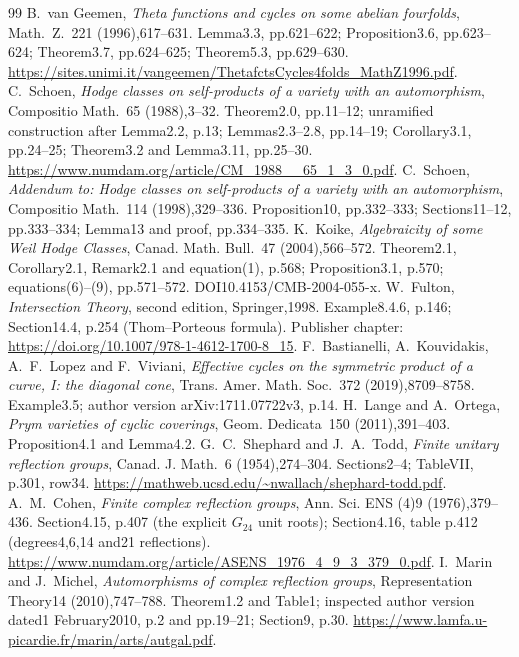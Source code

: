 \begin{thebibliography}{99}
\small
{} B.~van Geemen, \emph{Theta functions and cycles on some abelian fourfolds}, Math.~Z.~221 (1996),617--631. Lemma3.3, pp.621--622; Proposition3.6, pp.623--624; Theorem3.7, pp.624--625; Theorem5.3, pp.629--630. \url{https://sites.unimi.it/vangeemen/ThetafctsCycles4folds_MathZ1996.pdf}.
 C.~Schoen, \emph{Hodge classes on self-products of a variety with an automorphism}, Compositio Math.~65 (1988),3--32. Theorem2.0, pp.11--12; unramified construction after Lemma2.2, p.13; Lemmas2.3--2.8, pp.14--19; Corollary3.1, pp.24--25; Theorem3.2 and Lemma3.11, pp.25--30. \url{https://www.numdam.org/article/CM_1988__65_1_3_0.pdf}.
 C.~Schoen, \emph{Addendum to: Hodge classes on self-products of a variety with an automorphism}, Compositio Math.~114 (1998),329--336. Proposition10, pp.332--333; Sections11--12, pp.333--334; Lemma13 and proof, pp.334--335.
 K.~Koike, \emph{Algebraicity of some Weil Hodge Classes}, Canad. Math. Bull.~47 (2004),566--572. Theorem2.1, Corollary2.1, Remark2.1 and equation(1), p.568; Proposition3.1, p.570; equations(6)--(9), pp.571--572. DOI10.4153/CMB-2004-055-x.
 W.~Fulton, \emph{Intersection Theory}, second edition, Springer,1998. Example8.4.6, p.146; Section14.4, p.254 (Thom--Porteous formula). Publisher chapter: \url{https://doi.org/10.1007/978-1-4612-1700-8_15}.
 F.~Bastianelli, A.~Kouvidakis, A.~F.~Lopez and F.~Viviani, \emph{Effective cycles on the symmetric product of a curve, I: the diagonal cone}, Trans. Amer. Math. Soc.~372 (2019),8709--8758. Example3.5; author version arXiv:1711.07722v3, p.14.
 H.~Lange and A.~Ortega, \emph{Prym varieties of cyclic coverings}, Geom. Dedicata~150 (2011),391--403. Proposition4.1 and Lemma4.2.
 G.~C.~Shephard and J.~A.~Todd, \emph{Finite unitary reflection groups}, Canad. J. Math.~6 (1954),274--304. Sections2--4; TableVII, p.301, row34. \url{https://mathweb.ucsd.edu/~nwallach/shephard-todd.pdf}.
 A.~M.~Cohen, \emph{Finite complex reflection groups}, Ann. Sci. ENS (4)9 (1976),379--436. Section4.15, p.407 (the explicit $G_{24}$ unit roots); Section4.16, table p.412 (degrees4,6,14 and21 reflections). \url{https://www.numdam.org/article/ASENS_1976_4_9_3_379_0.pdf}.
 I.~Marin and J.~Michel, \emph{Automorphisms of complex reflection groups}, Representation Theory14 (2010),747--788. Theorem1.2 and Table1; inspected author version dated1 February2010, p.2 and pp.19--21; Section9, p.30. \url{https://www.lamfa.u-picardie.fr/marin/arts/autgal.pdf}.

\end{thebibliography}
